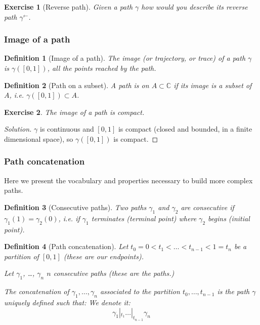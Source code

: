 \documentclass{article}
\newtheorem*{defi}{Definition}
\newtheorem{exo}{Exercise}
\begin{document}
\begin{exo}[Reverse path]
    Given a path $\gamma$ how would you describe its reverse path $\gamma^{\leftarrow}$.
\end{exo}


\subsubsection{Image of a path}
\begin{defi}[Image of a path]
    The image (or trajectory, or trace) of a path $\gamma$ is $\gamma([0,1])$, all the points reached by the path.
\end{defi}

\begin{defi}[Path on a subset]
    A path is \emph{on $A\subset\mathbb{C}$} if its image is a subset of $A$, i.e. $\gamma([0,1])\subset A$.
\end{defi}

\begin{exo}
    The image of a path is compact.
\end{exo}

\begin{proof}[Solution]
    $\gamma$ is continuous and $[0,1]$ is compact (closed and bounded, in a finite dimensional space), so $\gamma([0,1])$ is compact.
\end{proof}

\subsubsection{Path concatenation}

Here we present the vocabulary and properties necessary to build more complex paths.
\begin{defi}[Consecutive paths]
    Two paths $\gamma_1$ and $\gamma_2$ are consecutive if $\gamma_1(1) = \gamma_2(0)$, i.e. if $\gamma_1$ terminates (terminal point) where $\gamma_2$ begins (initial point).
\end{defi}

\begin{defi}[Path concatenation]
    Let $t_0=0 < t_1 < \dots < t_{n-1} < 1=t_n $ be a partition of $[0,1]$ (these are our endpoints).

    Let $\gamma_1$, \dots, $\gamma_n$ $n$ consecutive paths (these are the paths.)

    The concatenation of $\gamma_1, \dots, \gamma_n$ associated to the partition $t_0, \dots, t_{n-1}$ is the path $\gamma$ uniquely defined such that:
    We denote it:
    $$ \gamma_1 |_{t_1} \dots |_{t_{n-1}} \gamma_n$$
\end{defi}
\end{document}
